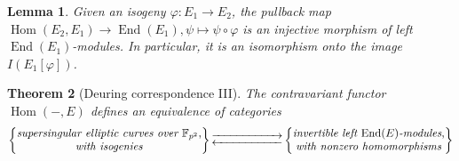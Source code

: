 \documentclass[10pt]{article}
\theoremstyle{plain}
\newtheorem{theorem}{Theorem}
\newtheorem{lemma}[theorem]{Lemma}
\theoremstyle{definition}
\DeclareMathOperator{\End}{End} %
\DeclareMathOperator{\Hom}{Hom} %
\def\F{\ensuremath{\mathbb{F}}}
\begin{document}
\begin{prposition}
\begin{lemma}
    Given an isogeny $\varphi:E_1\to E_2$, the pullback map
    $\Hom(E_2,E_1)\to\End(E_1), \psi\mapsto \psi\circ\varphi$
    is an injective morphism of left $\End(E_1)$-modules.
    In particular, it is an isomorphism onto the image $I(E_1[\varphi])$.
\end{lemma}

\begin{theorem}[Deuring correspondence III] 
    The contravariant functor $\Hom(-,E)$
    defines an equivalence of categories
    \begin{equation*}
        \left\{
            \begin{tabular}{@{} c @{}}
                \emph{supersingular elliptic curves over $\F_{p^2}$}, \\
                \emph{with isogenies}
            \end{tabular}
        \right\}
        \begin{gathered}
            \overset{}{\xrightarrow{\hspace*{2cm}}} \\[-2ex]
            \underset{}{\xleftarrow{\hspace*{2cm}}}
        \end{gathered}
        \left\{
            \begin{tabular}{@{} c @{}}
                \emph{invertible left $\End(E)$-modules}, \\
                \emph{with nonzero homomorphisms}
            \end{tabular}
        \right\}
    \end{equation*}
\end{theorem}


\end{prposition}
\end{document}
